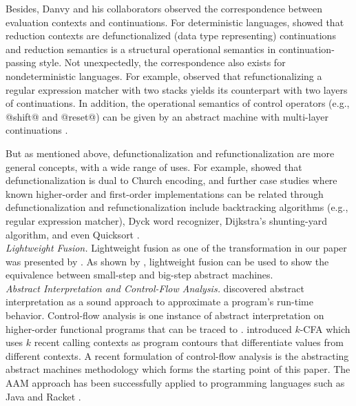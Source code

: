 \documentclass[acmsmall, screen]{acmart}\settopmatter{}
\begin{document}
Besides, Danvy and his collaborators observed the correspondence between evaluation contexts and continuations.
For deterministic languages, \citet{Danvy:2008:DIP:1411204.1411206} showed that reduction contexts
are defunctionalized (data type representing) continuations and reduction semantics is a structural
operational semantics in continuation-passing style.
Not unexpectedly, the correspondence also exists for nondeterministic languages. For example,
\citet{Danvy:2001:DW:773184.773202} observed that refunctionalizing a regular expression matcher
with two stacks yields its counterpart with two layers of continuations.
In addition, the operational semantics of control operators (e.g., @shift@ and @reset@) can be given by an
abstract machine with multi-layer continuations \cite{Danvy:1990:AC:91556.91622, lmcs:2269}.

But as mentioned above, defunctionalization and refunctionalization are more general concepts,
with a wide range of uses. For example, \citet{Danvy:2001:DW:773184.773202} showed that
defunctionalization is dual to Church encoding, and further case studies where known
higher-order and first-order implementations can be related through defunctionalization
and refunctionalization include backtracking algorithms (e.g., regular expression matcher),
Dyck word recognizer, Dijkstra's shunting-yard algorithm, and even Quicksort
\cite{Danvy:2006:RW:2171265.2171268, DANVY2009534, Danvy:2001:DW:773184.773202}. \\


\textit{Lightweight Fusion.}
Lightweight fusion as one of the transformation in our paper was presented by
\citet{Ohori:2007:LFF:1190216.1190241}.
As shown by \citet{DANVY2008100}, lightweight fusion can be used to show the
equivalence between small-step and big-step abstract machines.\\

\textit{Abstract Interpretation and Control-Flow Analysis.}
 discovered abstract interpretation as a sound approach to
approximate a program's run-time behavior. Control-flow analysis
is one instance of abstract interpretation on higher-order functional programs that can be traced to \citet{jones1981flow}. 
introduced $k$-CFA which uses $k$ recent calling contexts as program contours that
differentiate values from different contexts.
A recent formulation of control-flow analysis is the abstracting abstract machines
methodology \cite{van2012systematic, van2010abstracting} which forms the starting point
of this paper. The AAM approach has been successfully applied to programming languages such as Java \cite{might2010resolving} and
Racket \cite{Tobin-Hochstadt:2012:HSE:2384616.2384655}. \\
\end{document}
